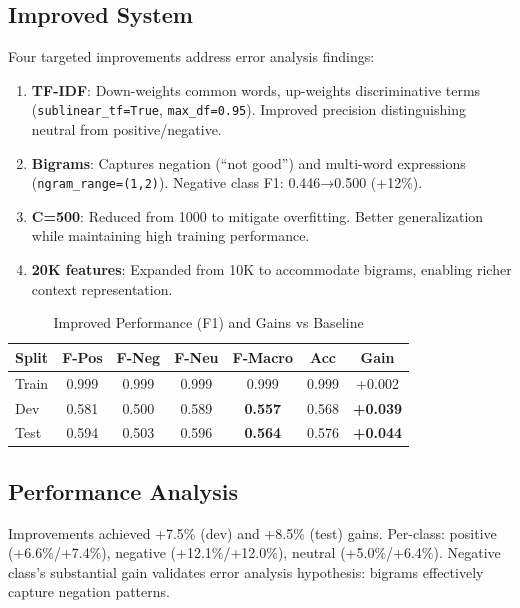 \documentclass[10pt,a4paper]{article}
\begin{document}
\subsection{Improved System}
Four targeted improvements address error analysis findings:

\begin{enumerate}
    \item \textbf{TF-IDF}: Down-weights common words, up-weights discriminative terms (\texttt{sublinear\_tf=True}, \texttt{max\_df=0.95}). Improved precision distinguishing neutral from positive/negative.
    
    \item \textbf{Bigrams}: Captures negation (``not good'') and multi-word expressions (\texttt{ngram\_range=(1,2)}). Negative class F1: 0.446→0.500 (+12\%).
    
    \item \textbf{C=500}: Reduced from 1000 to mitigate overfitting. Better generalization while maintaining high training performance.
    
    \item \textbf{20K features}: Expanded from 10K to accommodate bigrams, enabling richer context representation.
\end{enumerate}

\begin{table}[h]
\centering
\caption{Improved Performance (F1) and Gains vs Baseline}
\label{tab:improved}
\scriptsize
\begin{tabular}{lccccc|c}
\toprule
\textbf{Split} & \textbf{F-Pos} & \textbf{F-Neg} & \textbf{F-Neu} & \textbf{F-Macro} & \textbf{Acc} & \textbf{Gain} \\
\midrule
Train & 0.999 & 0.999 & 0.999 & 0.999 & 0.999 & +0.002 \\
Dev   & 0.581 & 0.500 & 0.589 & \textbf{0.557} & 0.568 & \textbf{+0.039} \\
Test  & 0.594 & 0.503 & 0.596 & \textbf{0.564} & 0.576 & \textbf{+0.044} \\
\bottomrule
\end{tabular}
\end{table}

\subsection{Performance Analysis}

Improvements achieved +7.5\% (dev) and +8.5\% (test) gains. Per-class: positive (+6.6\%/+7.4\%), negative (+12.1\%/+12.0\%), neutral (+5.0\%/+6.4\%). Negative class's substantial gain validates error analysis hypothesis: bigrams effectively capture negation patterns.
\end{document}
